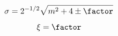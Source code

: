   \begin{equation*}   %
      \sigma = 2^{-1/2} \sqrt{m^{2} + 4 \pm \factor}
  \end{equation*}

  \begin{equation*}   %
      \xi = \factor
  \end{equation*}


